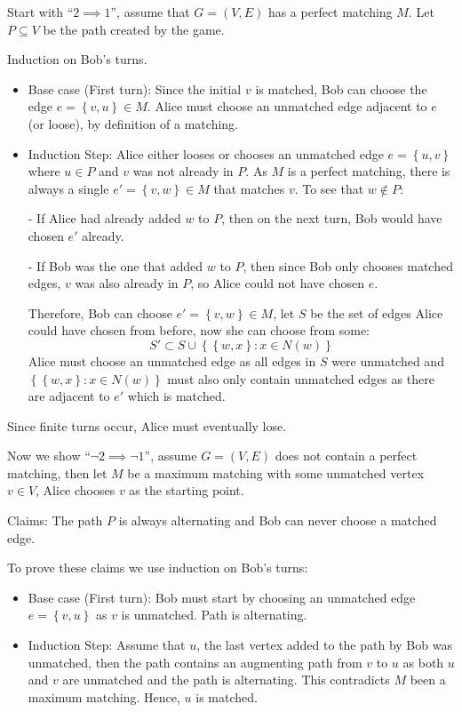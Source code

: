 \documentclass[a4paper, 11pt]{article}
\def\set#1{\left\{ #1 \right\}}
\begin{document}
\begin{multicols*}{2}
	Start with ``$2\implies 1$'', assume that $G=(V,E)$ has a perfect matching $M$. Let $P\subseteq V$ be the path created by the game.

	Induction on Bob's turns.
	\begin{itemize}
		\item
		      Base case (First turn): Since the initial $v$ is matched, Bob can choose the edge $e=\set{v,u}\in M$. Alice must choose an unmatched edge adjacent to $e$ (or loose), by definition of a matching.

		\item
		      Induction Step: Alice either looses or chooses an unmatched edge $e=\set{u,v}$ where $u\in P$ and $v$ was not already in $P$. As $M$ is a perfect matching, there is always a single $e'=\set{v,w}\in M$ that matches $v$. To see that $w\notin P$:

		      - If Alice had already added $w$ to $P$, then on the next turn, Bob would have chosen $e'$ already.

		      - If Bob was the one that added $w$ to $P$, then since Bob only chooses matched edges, $v$ was also already in $P$, so Alice could not have chosen $e$.

		      Therefore, Bob can choose $e'=\set{v,w}\in M$, let $S$ be the set of edges Alice could have chosen from before, now she can choose from some:
		      $$S'\subset S \cup \set{\set{w, x} : x\in N(w)} $$
		      Alice must choose an unmatched edge as all edges in $S$ were unmatched and $\set{\set{w, x} : x\in N(w)}$ must also only contain unmatched edges as there are adjacent to $e'$ which is matched.
	\end{itemize}
	Since finite turns occur, Alice must eventually lose.


	Now we show ``$\neg 2\implies \neg 1$'', assume $G=(V,E)$ does not contain a perfect matching, then let $M$ be a maximum matching with some unmatched vertex $v\in V$, Alice chooses $v$ as the starting point.


	Claims: The path $P$ is always alternating and Bob can never choose a matched edge.

	To prove these claims we use induction on Bob's turns:

	\begin{itemize}
		\item
		      Base case (First turn): Bob must start by choosing an unmatched edge $e=\set{v,u}$ as $v$ is unmatched. Path is alternating.

		\item Induction Step:
		      Assume that $u$, the last vertex added to the path by Bob was unmatched, then the path contains an augmenting path from $v$ to $u$ as both $u$ and $v$ are unmatched and the path is alternating. This contradicts $M$ been a maximum matching. Hence, $u$ is matched.


\end{itemize}
\end{multicols*}
\end{document}
